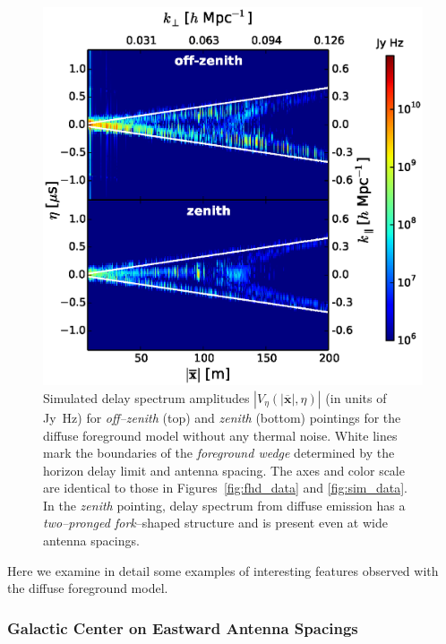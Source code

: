\documentclass[preprint2,iop,numberedappendix]{emulateapj}
\begin{document}
\begin{figure}[htb]
\centering
\includegraphics[width=\linewidth]{figures/v1_0/delta_array_multi_baseline_CLEAN_noiseless_visibilities_0.3m_ground_custom_gaussian_FG_model_dsm_all_sky_nside_64_Tsys_95.0K_185.0_MHz_30.7_MHz_bhw2.0.eps}
\caption{Simulated delay spectrum amplitudes $|V_\eta(|\overline{\mathbf{x}}|,\eta)|$ (in units of Jy~Hz) for {\it off--zenith} (top) and {\it zenith} (bottom) pointings for the diffuse foreground model without any thermal noise. White lines mark the boundaries of the {\it foreground wedge} determined by the horizon delay limit and antenna spacing. The axes and color scale are identical to those in Figures~\ref{fig:fhd_data} and \ref{fig:sim_data}. In the {\it zenith} pointing, delay spectrum from diffuse emission has a {\it two--pronged fork}--shaped structure and is present even at wide antenna spacings. \label{fig:noiseless-dsm-delay-spectrum}}
\end{figure}

Here we examine in detail some examples of interesting features observed with the diffuse foreground model.

\subsubsection{Galactic Center on Eastward Antenna Spacings}\label{sec:GC-east}
\end{document}
